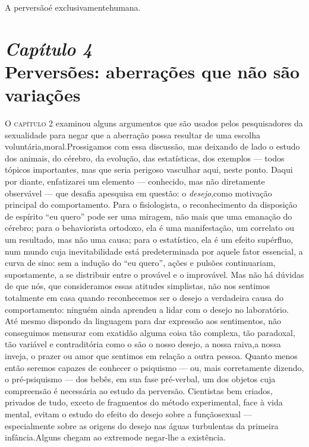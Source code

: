 A perversão\idxvaria[|)] é exclusivamente\idxanimvers[|)] humana.




\chapter[\textbf{4}\quad Perversões: aberrações que não são variações]{{\large\textit{Capítulo 4}}\\ Perversões: aberrações que não são variações}


\textsc{O capítulo 2} examinou alguns argumentos que são usados pelos
pesquisadores da sexualidade para negar que a aberração possa
resultar de uma escolha voluntária,\idxpervrespo[|(] moral.\idxrespo[|(] Prossigamos com essa
discussão, mas deixando de lado o estudo dos animais, do cérebro, da
evolução, das estatísticas, dos exemplos --- todos tópicos importantes,
mas que seria perigoso vasculhar aqui, neste ponto. Daqui por diante,
enfatizarei um elemento --- conhecido, mas não diretamente observável ---
que desafia a\idxsexop[|(] pesquisa em questão: o \textit{desejo},\idxpervdesej[|(] como motivação
principal do comportamento. Para o fisiologista, o reconhecimento da
disposição de espírito ``eu quero'' pode ser uma miragem, não mais que
uma emanação do cérebro; para o behaviorista ortodoxo, ela é uma
manifestação, um correlato ou um resultado, mas não uma causa; para o
estatístico, ela é um efeito supérfluo, num mundo cuja inevitabilidade
está predeterminada por aquele fator essencial, a curva de sino: sem a
indução do ``eu quero'', ações e pulsões continuariam, supostamente, a se
distribuir entre o provável e o improvável. Mas não há dúvidas de que
nós, que consideramos essas atitudes simplistas, não nos sentimos
totalmente em casa quando reconhecemos ser o desejo a verdadeira causa
do comportamento: ninguém ainda aprendeu a lidar com o desejo no
laboratório. Até mesmo dispondo da linguagem para dar expressão aos
sentimentos, não conseguimos mensurar com exatidão alguma coisa tão
complexa, tão paradoxal, tão variável e contraditória como o são o
nosso desejo, a nossa raiva,\idxhost[|(] a nossa inveja, o prazer ou amor que
sentimos em relação a outra pessoa. Quanto menos então seremos capazes
de conhecer o psiquismo --- ou, mais corretamente dizendo, o
pré-psiquismo --- dos bebês, em sua fase pré-verbal, um dos objetos cuja
compreensão é necessária ao estudo da perversão. Cientistas bem
criados, privados de tudo, exceto de fragmentos do método experimental,
face à vida mental, evitam o estudo do efeito do desejo sobre a função\idxpervrespo[|)]
sexual --- especialmente sobre as origens do desejo nas águas
turbulentas da primeira infância.\idxrespo[|)] Alguns chegam ao extremo\idxpervdesej[|)] de negar-lhe
a existência.

